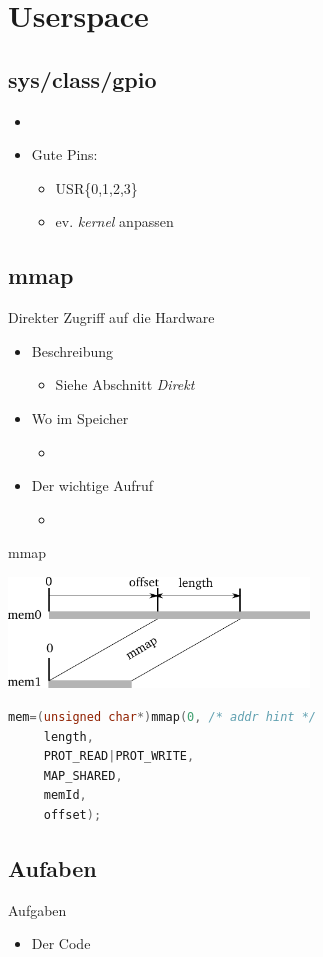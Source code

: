 \section{Userspace}
\subsection{sys/class/gpio}
\begin{frame}{}
 \begin{itemize}
  \item {}
  \item Gute Pins:
  \begin{itemize}
   \item USR\{0,1,2,3\}
   \item ev. {\em kernel} anpassen
  \end{itemize}
 \end{itemize}
\end{frame}

\subsection{mmap}
\begin{frame}{}{Direkter Zugriff auf die Hardware}
 \begin{itemize}
  \item Beschreibung
   \begin{itemize}
    \item Siehe Abschnitt {\em Direkt}
   \end{itemize}
  \item Wo im Speicher
   \begin{itemize}
    \item {}
   \end{itemize}
 \item Der wichtige Aufruf
  \begin{itemize}
   \item {}
  \end{itemize}
 \end{itemize}
\end{frame}

\begin{frame}[fragile]{mmap}
\begin{center}
 \includegraphics[width=8cm]{mmap.pdf}
\end{center}
\begin{lstlisting}[language=C]
 mem=(unsigned char*)mmap(0, /* addr hint */
     length,
     PROT_READ|PROT_WRITE,
     MAP_SHARED, 
     memId,
     offset);
\end{lstlisting}
\end{frame}

\subsection{Aufaben}
\begin{frame}{Aufgaben}
 \begin{itemize}
  \item Der Code 
 \end{itemize}
\end{frame}
